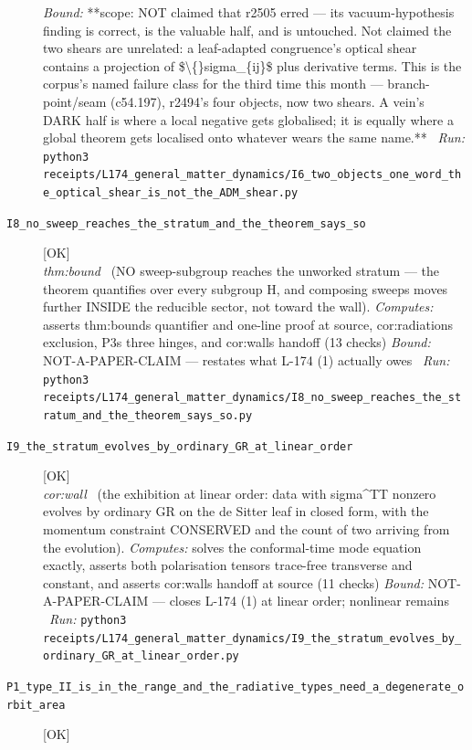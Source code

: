 \begin{description}
 \emph{Bound:} **scope: NOT claimed that r2505 erred --- its vacuum-hypothesis finding is correct, is the valuable half, and is untouched. Not claimed the two shears are unrelated: a leaf-adapted congruence's optical shear contains a projection of \$\textbackslash\{\}sigma\_\{ij\}\$ plus derivative terms.  This is the corpus's named failure class for the third time this month --- branch-point/seam (c54.197), r2494's four objects, now two shears. A vein's DARK half is where a local negative gets globalised; it is equally where a global theorem gets localised onto whatever wears the same name.**
\ \emph{Run:} \texttt{python3 receipts/L174\_general\_matter\_dynamics/I6\_two\_objects\_one\_word\_the\_optical\_shear\_is\_not\_the\_ADM\_shear.py}
\item[\label{rcpt:I8_no_sweep_reaches_the_stratum_and_the_theorem_says_so}\textbf{}\quad\texttt{I8\_no\_sweep\_reaches\_the\_stratum\_and\_the\_theorem\_says\_so}]\hfill\textsf{[OK]}\\
\textit{thm:bound} \ (NO sweep-subgroup reaches the unworked stratum --- the theorem quantifies over every subgroup H, and composing sweeps moves further INSIDE the reducible sector, not toward the wall). 
\emph{Computes:} asserts thm:bounds quantifier and one-line proof at source, cor:radiations exclusion, P3s three hinges, and cor:walls handoff (13 checks)
 \emph{Bound:} NOT-A-PAPER-CLAIM --- restates what L-174 (1) actually owes
\ \emph{Run:} \texttt{python3 receipts/L174\_general\_matter\_dynamics/I8\_no\_sweep\_reaches\_the\_stratum\_and\_the\_theorem\_says\_so.py}
\item[\label{rcpt:I9_the_stratum_evolves_by_ordinary_GR_at_linear_order}\textbf{}\quad\texttt{I9\_the\_stratum\_evolves\_by\_ordinary\_GR\_at\_linear\_order}]\hfill\textsf{[OK]}\\
\textit{cor:wall} \ (the exhibition at linear order: data with sigma\textasciicircum{}TT nonzero evolves by ordinary GR on the de Sitter leaf in closed form, with the momentum constraint CONSERVED and the count of two arriving from the evolution). 
\emph{Computes:} solves the conformal-time mode equation exactly, asserts both polarisation tensors trace-free transverse and constant, and asserts cor:walls handoff at source (11 checks)
 \emph{Bound:} NOT-A-PAPER-CLAIM --- closes L-174 (1) at linear order; nonlinear remains
\ \emph{Run:} \texttt{python3 receipts/L174\_general\_matter\_dynamics/I9\_the\_stratum\_evolves\_by\_ordinary\_GR\_at\_linear\_order.py}
\item[\label{rcpt:P1_type_II_is_in_the_range_and_the_radiative_types_need_a_degenerate_orbit_area}\textbf{}\quad\texttt{P1\_type\_II\_is\_in\_the\_range\_and\_the\_radiative\_types\_need\_a\_degenerate\_orbit\_area}]\hfill\textsf{[OK]}\\

\end{description}
